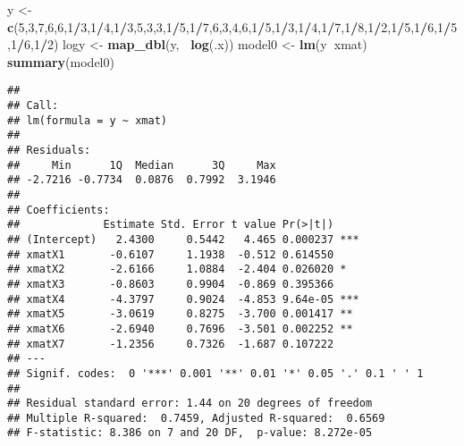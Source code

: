 \documentclass[
]{article}
\newenvironment{Shaded}{\begin{snugshade}}{\end{snugshade}}
\newcommand{\DecValTok}[1]{\textcolor[rgb]{0.00,0.00,0.81}{#1}}
\newcommand{\KeywordTok}[1]{\textcolor[rgb]{0.13,0.29,0.53}{\textbf{#1}}}
\newcommand{\NormalTok}[1]{#1}
\newcommand{\OperatorTok}[1]{\textcolor[rgb]{0.81,0.36,0.00}{\textbf{#1}}}
\newcommand{\StringTok}[1]{\textcolor[rgb]{0.31,0.60,0.02}{#1}}
\begin{document}
\begin{Shaded}
\begin{Highlighting}[]
\NormalTok{y <-}\StringTok{ }\KeywordTok{c}\NormalTok{(}\DecValTok{5}\NormalTok{,}\DecValTok{3}\NormalTok{,}\DecValTok{7}\NormalTok{,}\DecValTok{6}\NormalTok{,}\DecValTok{6}\NormalTok{,}\DecValTok{1}\OperatorTok{/}\DecValTok{3}\NormalTok{,}\DecValTok{1}\OperatorTok{/}\DecValTok{4}\NormalTok{,}\DecValTok{1}\OperatorTok{/}\DecValTok{3}\NormalTok{,}\DecValTok{5}\NormalTok{,}\DecValTok{3}\NormalTok{,}\DecValTok{3}\NormalTok{,}\DecValTok{1}\OperatorTok{/}\DecValTok{5}\NormalTok{,}\DecValTok{1}\OperatorTok{/}\DecValTok{7}\NormalTok{,}\DecValTok{6}\NormalTok{,}\DecValTok{3}\NormalTok{,}\DecValTok{4}\NormalTok{,}\DecValTok{6}\NormalTok{,}\DecValTok{1}\OperatorTok{/}\DecValTok{5}\NormalTok{,}\DecValTok{1}\OperatorTok{/}\DecValTok{3}\NormalTok{,}\DecValTok{1}\OperatorTok{/}\DecValTok{4}\NormalTok{,}\DecValTok{1}\OperatorTok{/}\DecValTok{7}\NormalTok{,}\DecValTok{1}\OperatorTok{/}\DecValTok{8}\NormalTok{,}\DecValTok{1}\OperatorTok{/}\DecValTok{2}\NormalTok{,}\DecValTok{1}\OperatorTok{/}\DecValTok{5}\NormalTok{,}\DecValTok{1}\OperatorTok{/}\DecValTok{6}\NormalTok{,}\DecValTok{1}\OperatorTok{/}\DecValTok{5}\NormalTok{,}\DecValTok{1}\OperatorTok{/}\DecValTok{6}\NormalTok{,}\DecValTok{1}\OperatorTok{/}\DecValTok{2}\NormalTok{)}
\NormalTok{logy <-}\StringTok{ }\KeywordTok{map_dbl}\NormalTok{(y, }\OperatorTok{~}\KeywordTok{log}\NormalTok{(.x))}
\NormalTok{model0 <-}\StringTok{ }\KeywordTok{lm}\NormalTok{(y}\OperatorTok{~}\NormalTok{xmat)}
\KeywordTok{summary}\NormalTok{(model0)}
\end{Highlighting}
\end{Shaded}

\begin{verbatim}
## 
## Call:
## lm(formula = y ~ xmat)
## 
## Residuals:
##     Min      1Q  Median      3Q     Max 
## -2.7216 -0.7734  0.0876  0.7992  3.1946 
## 
## Coefficients:
##             Estimate Std. Error t value Pr(>|t|)    
## (Intercept)   2.4300     0.5442   4.465 0.000237 ***
## xmatX1       -0.6107     1.1938  -0.512 0.614550    
## xmatX2       -2.6166     1.0884  -2.404 0.026020 *  
## xmatX3       -0.8603     0.9904  -0.869 0.395366    
## xmatX4       -4.3797     0.9024  -4.853 9.64e-05 ***
## xmatX5       -3.0619     0.8275  -3.700 0.001417 ** 
## xmatX6       -2.6940     0.7696  -3.501 0.002252 ** 
## xmatX7       -1.2356     0.7326  -1.687 0.107222    
## ---
## Signif. codes:  0 '***' 0.001 '**' 0.01 '*' 0.05 '.' 0.1 ' ' 1
## 
## Residual standard error: 1.44 on 20 degrees of freedom
## Multiple R-squared:  0.7459, Adjusted R-squared:  0.6569 
## F-statistic: 8.386 on 7 and 20 DF,  p-value: 8.272e-05
\end{verbatim}
\end{document}
